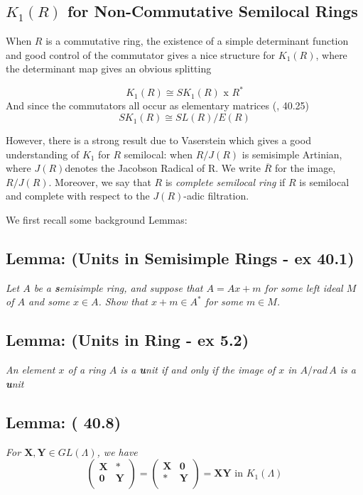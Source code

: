\subsection{ $K_1 (R)$ for Non-Commutative Semilocal Rings\label{non-comm}}


When $R$ is a commutative ring, the existence of a simple determinant function and good control of the commutator gives a nice structure for $K_1(R)$, where the determinant map gives an obvious splitting

$$K_1(R) \cong SK_1(R) \text{ x } R^*$$
And since the commutators all occur as elementary matrices (\cite{CR}, 40.25) 
$$SK_1(R) \cong SL(R) / E(R)$$

However, there is a strong result due to Vaserstein which gives a good understanding of $K_1$ for $R$ semilocal: when $R/ J(R)$ is semisimple Artinian, where $J(R)$denotes the Jacobson Radical of R. We write $\overline R$ for the image, $R/J(R)$. Moreover, we say that $R$ is \emph{complete semilocal ring} if $R$ is semilocal and complete with respect to the $J(R)$-adic filtration.

We first recall some background Lemmas:

\subsection{Lemma: (Units in Semisimple Rings - \cite{CR} ex 40.1)\label{units in semisimple}}
\emph{Let $A$ be a \textbf semisimple ring, and suppose that $A = Ax +m$ for some left ideal $M$ of $A$ and some $x\in A$. Show that $x+m\in A^*$ for some $m\in M$.}



\subsection{Lemma: (Units in Ring  - \cite{CR} ex 5.2)\label{units in rings}}
\emph{An element $x$ of a ring $A$ is a \textbf unit if and only if the image of $x$ in $A/ rad \, A$ is a \textbf unit}

\subsection{Lemma: (\cite{CR} 40.8)}
\emph{For $\mathbf{X,Y}\in GL(\Lambda)$, we have
$$ \left( \begin{array}{cc}
\mathbf X& *\\
\mathbf 0 & \mathbf Y\\ \end{array}\right)=
 \left( \begin{array}{cc}
\mathbf X& \mathbf  0\\
* & \mathbf Y\\ \end{array}\right)= \mathbf{XY}\text{ in } K_1(\Lambda)$$}

